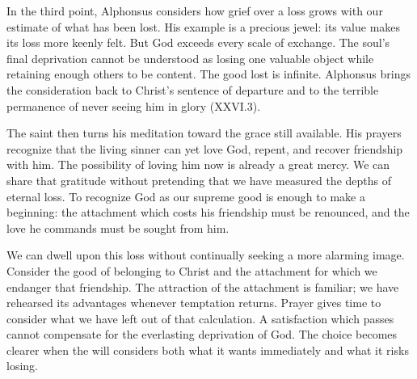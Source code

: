 In the third point, Alphonsus considers how grief over a loss grows with our estimate of what has been lost. His example is a precious jewel: its value makes its loss more keenly felt. But God exceeds every scale of exchange. The soul's final deprivation cannot be understood as losing one valuable object while retaining enough others to be content. The good lost is infinite. Alphonsus brings the consideration back to Christ's sentence of departure and to the terrible permanence of never seeing him in glory (XXVI.3).

The saint then turns his meditation toward the grace still available. His prayers recognize that the living sinner can yet love God, repent, and recover friendship with him. The possibility of loving him now is already a great mercy. We can share that gratitude without pretending that we have measured the depths of eternal loss. To recognize God as our supreme good is enough to make a beginning: the attachment which costs his friendship must be renounced, and the love he commands must be sought from him.

We can dwell upon this loss without continually seeking a more alarming image. Consider the good of belonging to Christ and the attachment for which we endanger that friendship. The attraction of the attachment is familiar; we have rehearsed its advantages whenever temptation returns. Prayer gives time to consider what we have left out of that calculation. A satisfaction which passes cannot compensate for the everlasting deprivation of God. The choice becomes clearer when the will considers both what it wants immediately and what it risks losing.

